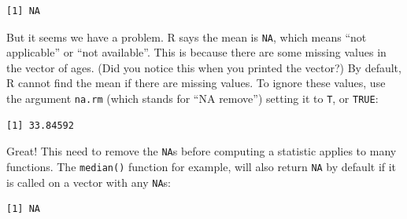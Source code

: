 \documentclass[
  letterpaper,
  DIV=11,
  numbers=noendperiod]{scrreprt}
\newenvironment{Shaded}{\begin{snugshade}}{\end{snugshade}}
\newcommand{\AttributeTok}[1]{\textcolor[rgb]{0.40,0.45,0.13}{#1}}
\newcommand{\CommentTok}[1]{\textcolor[rgb]{0.37,0.37,0.37}{#1}}
\newcommand{\FunctionTok}[1]{\textcolor[rgb]{0.28,0.35,0.67}{#1}}
\newcommand{\NormalTok}[1]{\textcolor[rgb]{0.00,0.23,0.31}{#1}}
\newcommand{\SpecialCharTok}[1]{\textcolor[rgb]{0.37,0.37,0.37}{#1}}
\begin{document}
\begin{Shaded}
\end{Shaded}

\begin{verbatim}
[1] NA
\end{verbatim}

But it seems we have a problem. R says the mean is \texttt{NA}, which
means ``not applicable'' or ``not available''. This is because there are
some missing values in the vector of ages. (Did you notice this when you
printed the vector?) By default, R cannot find the mean if there are
missing values. To ignore these values, use the argument \texttt{na.rm}
(which stands for ``NA remove'') setting it to \texttt{T}, or
\texttt{TRUE}:

\begin{Shaded}
\end{Shaded}

\begin{verbatim}
[1] 33.84592
\end{verbatim}

Great! This need to remove the \texttt{NA}s before computing a statistic
applies to many functions. The \texttt{median()} function for example,
will also return \texttt{NA} by default if it is called on a vector with
any \texttt{NA}s:

\begin{Shaded}
\end{Shaded}

\begin{verbatim}
[1] NA
\end{verbatim}

\begin{Shaded}
\end{Shaded}
\end{document}
